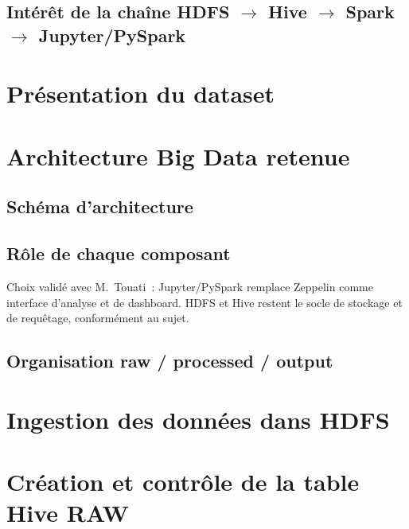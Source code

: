 \documentclass[11pt,a4paper]{report}
\begin{document}
\section{Intérêt de la chaîne HDFS $\to$ Hive $\to$ Spark $\to$ Jupyter/PySpark}

\chapter{Présentation du dataset}

\chapter{Architecture Big Data retenue}
\section{Schéma d'architecture}

\section{Rôle de chaque composant}

\begin{constat}
Choix validé avec M.~Touati~: Jupyter/PySpark remplace Zeppelin comme
interface d'analyse et de dashboard. HDFS et Hive restent le socle de
stockage et de requêtage, conformément au sujet.
\end{constat}

\section{Organisation raw / processed / output}

\chapter{Ingestion des données dans HDFS}

\chapter{Création et contrôle de la table Hive RAW}
\end{document}
